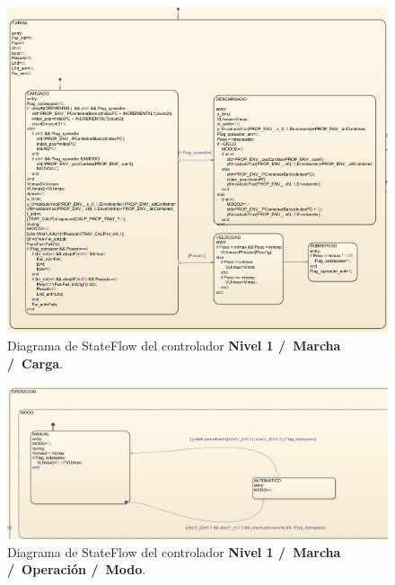 \documentclass[11pt]{article}
\begin{document}
\begin{figure}
	\centering
	\includegraphics[width=1\textwidth]{images/stateflow_nivel_1/controlador_nivel1_carga.png}
	\caption{Diagrama de StateFlow del controlador \textbf{Nivel 1 /\ Marcha /\ Carga}.}
	\label{fig:nivel_1_carga}
\end{figure}

\begin{figure}
	\centering
	\includegraphics[width=1\textwidth]{images/stateflow_nivel_1/controlador_nivel1_operacion_modo.png}
	\caption{Diagrama de StateFlow del controlador \textbf{Nivel 1 /\ Marcha /\ Operación /\ Modo}.}
	\label{fig:nivel_1_modo}
\end{figure}
\end{document}
